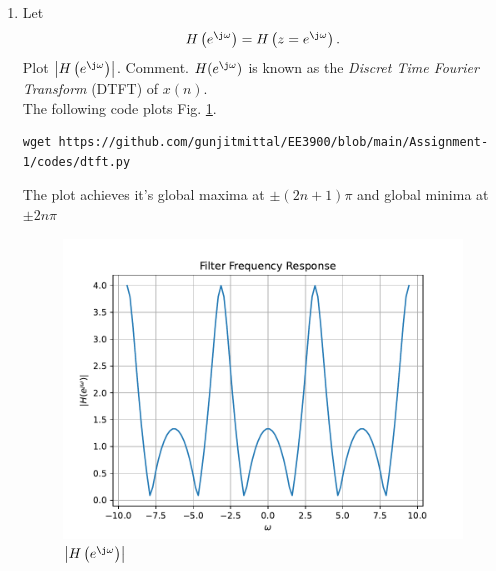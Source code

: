 \documentclass[journal,12pt,twocolumn]{IEEEtran}
\renewcommand\thesection{\arabic{section}}
\begin{document}
\begin{enumerate}[label=\thesection.\arabic*]
\item 
Let
\begin{equation}
H\brak{e^{\j \omega}} = H\brak{z = e^{\j \omega}}.
\end{equation}
Plot $\abs{H\brak{e^{\j \omega}}}$.  Comment.  $H(e^{\j \omega})$ is
known as the {\em Discret Time Fourier Transform} (DTFT) of $x(n)$.
\\
\solution The following code plots Fig. \ref{fig:dtft}.
\begin{lstlisting}
wget https://github.com/gunjitmittal/EE3900/blob/main/Assignment-1/codes/dtft.py
\end{lstlisting}
The plot achieves it's global maxima at $\pm(2n+1)\pi$ and global minima at $\pm 2n\pi$
\begin{figure}[!ht]
\centering
\includegraphics[width=\columnwidth]{./figs/dtft}
\caption{$\abs{H\brak{e^{\j\omega}}}$}
\label{fig:dtft}
\end{figure}
\end{enumerate}
\end{document}
